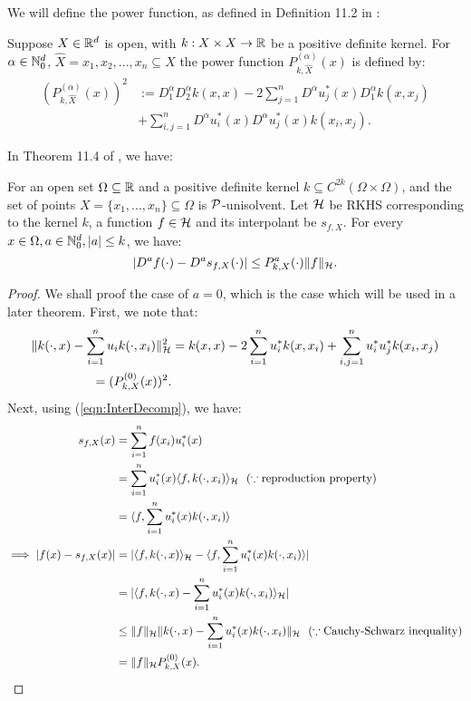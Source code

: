 \documentclass[twoside]{memoir}
\begin{document}
We will define the power function, as defined in Definition 11.2 in \cite{ScatteredDataApproximation}:
\begin{defn}
	Suppose $X \in \mathbb{R}^d$ is open, with $k: X \times X \rightarrow \mathbb{R}$ be a positive definite kernel. For $\alpha \in \mathbb{N}_0^d$, $\hat{X} = {x_1, x_2, ..., x_n} \subseteq X$ the power function $P^{(\alpha)}_{k,\hat{X}}(x)$ is defined by:
	\begin{equation*}
	\begin{split}
	(P^{(\alpha)}_{k,\hat{X}}(x))^2 &:= D_1^\alpha D_2^\alpha k(x, x) 
	- 2 \sum_{j=1}^n D^{\alpha}u_j^*(x)D_1^\alpha k(x, x_j) \\
	&+ \sum_{i,j = 1}^{n} D^\alpha u_i^*(x) D^\alpha u_j^*(x) k(x_i, x_j).
	\end{split}
	\end{equation*}
\end{defn}
In Theorem 11.4 of \cite{ScatteredDataApproximation}, we have:
\begin{thm}\label{thm:PowerBound}
	For an open set $\Omega \subseteq \mathbb{R}$ and a positive definite kernel $k \subseteq C^{2k}(\Omega \times \Omega)$, and the set of points $X = \{x_1,..., x_n\} \subseteq \Omega$ is $\mathcal{P}$-unisolvent. Let $\mathcal{H}$ be RKHS corresponding to the kernel $k$, a function $f \in \mathcal{H}$ and its interpolant be $s_{f,X}$. For every $x \in \Omega, a \in \mathbb{N}_0^d, |a| \leq k$, we have:
	\begin{equation}
	|D^af(\cdot) - D^as_{f,X}(\cdot)| \leq P^{a}_{k,X}(\cdot) \lVert f\rVert_{\mathcal{H}}.
	\end{equation}
\end{thm}
\begin{proof}
	We shall proof the case of $a = 0$, which is the case which will be used in a later theorem.
	First, we note that:
	\begin{equation*}
	\begin{split}
	\lVert k(\cdot,x) - \sum_{i=1}^{n}u_ik(\cdot, x_i)\rVert^2_{\mathcal{H}} &= k(x,x) - 2\sum_{i=1}^{n}u^*_ik(x,x_i) + \sum_{i,j=1}^{n}u^*_iu^*_jk(x_i,x_j) \\
	= (P^{(0)}_{k,X}(x))^2.
	\end{split}
	\end{equation*}
	Next, using (\ref{eqn:InterDecomp}), we have:
	\begin{equation*}
	\begin{split}
	s_{f,X}(x) &= \sum_{i=1}^{n} f(x_i) u_i^*(x) \\
	&= \sum_{i=1}^{n} u_i^*(x) \langle f, k(\cdot, x_i)\rangle_{\mathcal{H}} ~~ (\because \text{reproduction property}) \\
	&= \langle f, \sum_{i=1}^{n}u_i^*(x) k(\cdot, x_i)\rangle \\
	\implies |f(x) - s_{f,X}(x)| &= | \langle f, k(\cdot, x)\rangle_{\mathcal{H}} -  \langle f, \sum_{i=1}^{n}u_i^*(x) k(\cdot, x_i)\rangle | \\
	&= |\langle f,  k(\cdot, x) - \sum_{i=1}^{n}u_i^*(x) k(\cdot, x_i)\rangle_{\mathcal{H}}| \\
	&\leq \lVert f\rVert_{\mathcal{H}} \lVert k(\cdot, x) - \sum_{i=1}^{n}u_i^*(x) k(\cdot, x_i)\rVert_{\mathcal{H}} ~~ (\because \text{Cauchy-Schwarz inequality}) \\
	&= \lVert f\rVert_{\mathcal{H}} P^{(0)}_{k,X}(x).
	\end{split}
	\end{equation*}
\end{proof}
\end{document}
